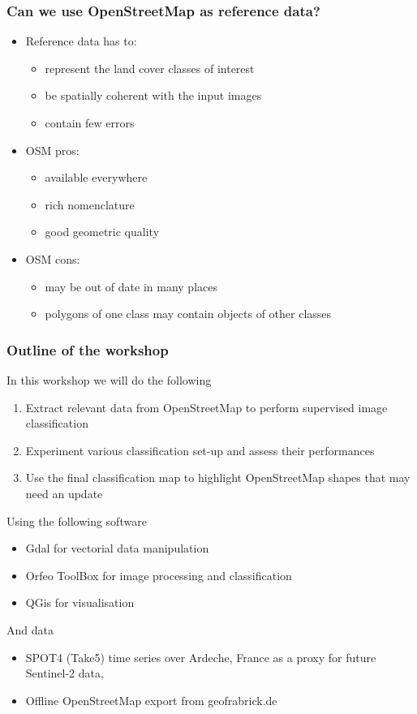 \documentclass[8pt]{beamer}
\begin{document}
\begin{frame}
\frametitle{Can we use OpenStreetMap as reference data?}
\begin{itemize}
\item Reference data has to:
  \begin{itemize}
  \item represent the land cover classes of interest
  \item be spatially coherent with the input images
  \item contain few errors
  \end{itemize}
\item OSM pros:
  \begin{itemize}
  \item available everywhere
  \item rich nomenclature
  \item good geometric quality
  \end{itemize}
\item OSM cons:
  \begin{itemize}
  \item may be out of date in many places
  \item polygons of one class may contain objects of other classes
  \end{itemize}
\end{itemize}


\end{frame}


\begin{frame}
\frametitle{Outline of the workshop}
\begin{block}{In this workshop we will do the following}
\begin{enumerate}
\item Extract relevant data from OpenStreetMap to perform supervised image classification
\item Experiment various classification set-up and assess their performances
\item Use the final classification map to highlight OpenStreetMap shapes that may need an update
\end{enumerate}
\end{block}
\begin{block}{Using the following software}
\begin{itemize}
\item Gdal for vectorial data manipulation
\item Orfeo ToolBox for image processing and classification
\item QGis for visualisation
\end{itemize}
\end{block}
\begin{block}{And data}
\begin{itemize}
\item SPOT4 (Take5) time series over Ardeche, France as a proxy for future Sentinel-2 data,
\item Offline OpenStreetMap export from geofrabrick.de
\end{itemize}
\end{block}

\end{frame}
\end{document}
